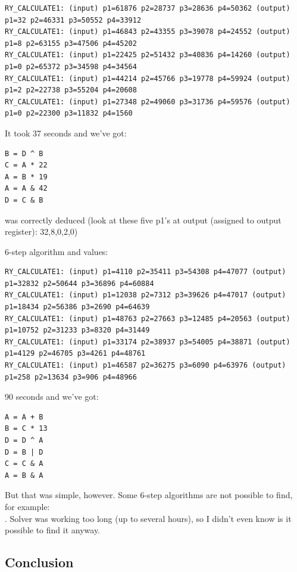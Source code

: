 \begin{lstlisting}
RY_CALCULATE1: (input) p1=61876 p2=28737 p3=28636 p4=50362 (output) p1=32 p2=46331 p3=50552 p4=33912
RY_CALCULATE1: (input) p1=46843 p2=43355 p3=39078 p4=24552 (output) p1=8 p2=63155 p3=47506 p4=45202
RY_CALCULATE1: (input) p1=22425 p2=51432 p3=40836 p4=14260 (output) p1=0 p2=65372 p3=34598 p4=34564
RY_CALCULATE1: (input) p1=44214 p2=45766 p3=19778 p4=59924 (output) p1=2 p2=22738 p3=55204 p4=20608
RY_CALCULATE1: (input) p1=27348 p2=49060 p3=31736 p4=59576 (output) p1=0 p2=22300 p3=11832 p4=1560
\end{lstlisting}

It took 37 seconds and we've got:

\begin{lstlisting}
B = D ^ B
C = A * 22
A = B * 19
A = A & 42
D = C & B
\end{lstlisting}

 was correctly deduced (look at these five p1's at output (assigned to output  register): 32,8,0,2,0)

6-step algorithm  and values:

\begin{lstlisting}
RY_CALCULATE1: (input) p1=4110 p2=35411 p3=54308 p4=47077 (output) p1=32832 p2=50644 p3=36896 p4=60884
RY_CALCULATE1: (input) p1=12038 p2=7312 p3=39626 p4=47017 (output) p1=18434 p2=56386 p3=2690 p4=64639
RY_CALCULATE1: (input) p1=48763 p2=27663 p3=12485 p4=20563 (output) p1=10752 p2=31233 p3=8320 p4=31449
RY_CALCULATE1: (input) p1=33174 p2=38937 p3=54005 p4=38871 (output) p1=4129 p2=46705 p3=4261 p4=48761
RY_CALCULATE1: (input) p1=46587 p2=36275 p3=6090 p4=63976 (output) p1=258 p2=13634 p3=906 p4=48966
\end{lstlisting}

90 seconds and we've got:

\begin{lstlisting}
A = A + B
B = C * 13
D = D ^ A
D = B | D
C = C & A
A = B & A
\end{lstlisting}

But that was simple, however. 
Some 6-step algorithms are not possible to find, for example: \\
.
Solver was working too long (up to several hours), so I didn't even know is it possible to find it anyway.

\subsection{Conclusion}

